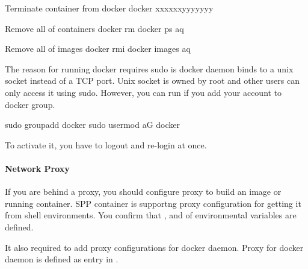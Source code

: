 \documentclass[a4paper,11pt,openany,oneside,english]{sphinxmanual}
\begin{document}
\begin{sphinxVerbatim}[commandchars=\\\{\},formatcom=\footnotesize]
 Terminate container from docker 
 docker  xxxxxx\PYGZus{}yyyyyyy

 Remove all of containers
 docker rm docker ps \PYGZhy{}aq

 Remove all of images
 docker rmi docker images \PYGZhy{}aq
\end{sphinxVerbatim}

The reason for running docker requires sudo is docker daemon
binds to a unix socket instead of a TCP port.
Unix socket is owned by root and other users can only access it using
sudo.
However, you can run if you add your account to docker group.

\begin{sphinxVerbatim}[commandchars=\\\{\},formatcom=\footnotesize]
 sudo groupadd docker
 sudo usermod \PYGZhy{}aG docker 
\end{sphinxVerbatim}

To activate it, you have to logout and re-login at once.


\paragraph{Network Proxy}
\label{\detokenize{tools/sppc/install:network-proxy}}
If you are behind a proxy, you should configure proxy to build an image
or running container.
SPP container is supportng proxy configuration for getting
it from shell environments.
You confirm that , 
and  of environmental variables are defined.

It also required to add proxy configurations for docker daemon.
Proxy for docker daemon is defined as \sphinxcode{\sphinxupquote{{[}Service{]}}} entry in
.

\begin{sphinxVerbatim}[commandchars=\\\{\},formatcom=\footnotesize]
\end{sphinxVerbatim}
\end{document}
